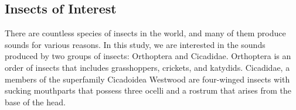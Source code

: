\subsection{Insects of Interest}
There are countless species of insects in the world, and many of them produce sounds for various reasons.
In this study, we are interested in the sounds produced by two groups of insects: Orthoptera and Cicadidae.
Orthoptera is an order of insects that includes grasshoppers, crickets, and katydids. \autocite{capineraOrthoptera2008}
Cicadidae, a members of the superfamily Cicadoidea Westwood are four-winged insects with sucking 
mouthparts that possess three ocelli and a rostrum that arises from the base of the head. \autocite{sanbornCicadasHemipteraCicadoidea2008}




